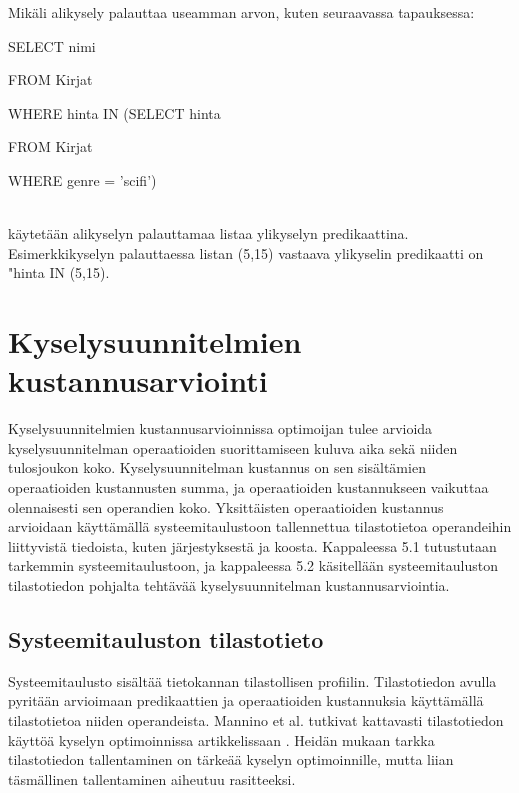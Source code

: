 \documentclass[finnish]{tktltiki2}
\theoremstyle{definition}
\theoremstyle{remark}
\begin{document}
Mikäli alikysely palauttaa useamman arvon, kuten seuraavassa tapauksessa:

\newline

\begin{frame}

SELECT nimi

FROM Kirjat

WHERE hinta IN (SELECT hinta
		
	FROM Kirjat

	WHERE genre = 'scifi')
\end{frame}
\\\newline
käytetään alikyselyn palauttamaa listaa ylikyselyn predikaattina. Esimerkkikyselyn palauttaessa listan (5,15) vastaava ylikyselin predikaatti on "hinta IN (5,15).


\section{Kyselysuunnitelmien kustannusarviointi}

Kyselysuunnitelmien kustannusarvioinnissa optimoijan tulee arvioida kyselysuunnitelman operaatioiden suorittamiseen kuluva aika sekä niiden tulosjoukon koko. Kyselysuunnitelman kustannus on sen sisältämien operaatioiden kustannusten summa, ja operaatioiden kustannukseen vaikuttaa olennaisesti sen operandien koko. Yksittäisten operaatioiden kustannus arvioidaan käyttämällä systeemitaulustoon tallennettua tilastotietoa operandeihin liittyvistä tiedoista, kuten järjestyksestä ja koosta. Kappaleessa 5.1 tutustutaan tarkemmin systeemitaulustoon, ja kappaleessa 5.2 käsitellään systeemitauluston tilastotiedon pohjalta tehtävää kyselysuunnitelman kustannusarviointia.


\subsection{Systeemitauluston tilastotieto}
Systeemitaulusto sisältää tietokannan tilastollisen profiilin. Tilastotiedon avulla pyritään arvioimaan predikaattien ja operaatioiden kustannuksia käyttämällä tilastotietoa niiden operandeista. Mannino et al. tutkivat kattavasti tilastotiedon käyttöä kyselyn optimoinnissa artikkelissaan \cite{mannino1988statistical}. Heidän mukaan tarkka tilastotiedon tallentaminen on tärkeää kyselyn optimoinnille, mutta liian täsmällinen tallentaminen aiheutuu rasitteeksi.
\end{document}
